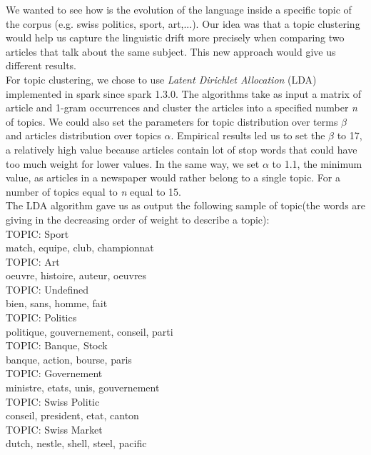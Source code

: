 We wanted to see how is the evolution of the language inside a specific topic of the corpus (e.g. swiss politics, sport, art,...).	
Our idea was that a topic clustering would help us capture the linguistic drift more precisely when comparing two articles that talk about the same subject.
This new approach would give us different results.\\
For topic clustering, we chose to use \emph{Latent Dirichlet Allocation} (LDA) implemented in spark since spark 1.3.0. 
The algorithms take as input a matrix of article and 1-gram occurrences and cluster the articles into a specified number \textit{n} of topics. We could also set the parameters for topic distribution over terms $\beta$ and articles distribution over topics $\alpha$. Empirical results led us to set the $\beta$ to 17, a relatively high value because articles contain lot of stop words that could have too much weight for lower values. In the same way, we set $\alpha$ to 1.1, the minimum value, as articles in a newspaper would rather belong to a single topic. For a number of topics equal to \textit{n} equal to 15.\\
The LDA algorithm gave us as output the following sample of topic(the words are giving in the decreasing order of weight to describe a topic):\\
TOPIC: Sport\\
match, equipe, club, championnat\\
TOPIC: Art\\
oeuvre, histoire, auteur, oeuvres\\
TOPIC: Undefined\\
bien, sans, homme, fait\\
TOPIC: Politics\\
politique, gouvernement, conseil, parti\\
TOPIC: Banque, Stock\\
banque, action, bourse, paris\\
TOPIC: Governement\\
ministre, etats, unis, gouvernement\\
TOPIC: Swiss Politic\\
conseil, president, etat, canton\\
TOPIC: Swiss Market\\
dutch, nestle, shell, steel, pacific\\

